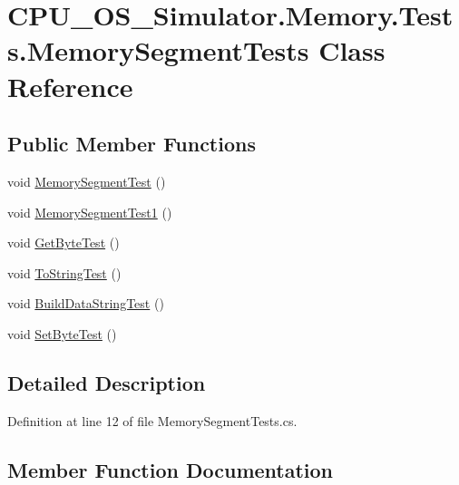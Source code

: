 \hypertarget{class_c_p_u___o_s___simulator_1_1_memory_1_1_tests_1_1_memory_segment_tests}{}\section{C\+P\+U\+\_\+\+O\+S\+\_\+\+Simulator.\+Memory.\+Tests.\+Memory\+Segment\+Tests Class Reference}
\label{class_c_p_u___o_s___simulator_1_1_memory_1_1_tests_1_1_memory_segment_tests}
\subsection*{Public Member Functions}
\begin{DoxyCompactItemize}
\item 
void \hyperlink{class_c_p_u___o_s___simulator_1_1_memory_1_1_tests_1_1_memory_segment_tests_a82762effc0343c94b33bc489750c956b}{Memory\+Segment\+Test} ()
\item 
void \hyperlink{class_c_p_u___o_s___simulator_1_1_memory_1_1_tests_1_1_memory_segment_tests_a807a686c73e7f114a38ae2432bdd184a}{Memory\+Segment\+Test1} ()
\item 
void \hyperlink{class_c_p_u___o_s___simulator_1_1_memory_1_1_tests_1_1_memory_segment_tests_a2228f143209fcd8a43e568f8a35166a8}{Get\+Byte\+Test} ()
\item 
void \hyperlink{class_c_p_u___o_s___simulator_1_1_memory_1_1_tests_1_1_memory_segment_tests_a1b749eaa20c05ec75cd61186d5080887}{To\+String\+Test} ()
\item 
void \hyperlink{class_c_p_u___o_s___simulator_1_1_memory_1_1_tests_1_1_memory_segment_tests_ab7c12761921a7c9a43f633e7fa21224d}{Build\+Data\+String\+Test} ()
\item 
void \hyperlink{class_c_p_u___o_s___simulator_1_1_memory_1_1_tests_1_1_memory_segment_tests_a26b873fdb5bfdf23ce87ee7fbedcfba9}{Set\+Byte\+Test} ()
\end{DoxyCompactItemize}


\subsection{Detailed Description}


Definition at line 12 of file Memory\+Segment\+Tests.\+cs.



\subsection{Member Function Documentation}
\hypertarget{class_c_p_u___o_s___simulator_1_1_memory_1_1_tests_1_1_memory_segment_tests_ab7c12761921a7c9a43f633e7fa21224d}{}
